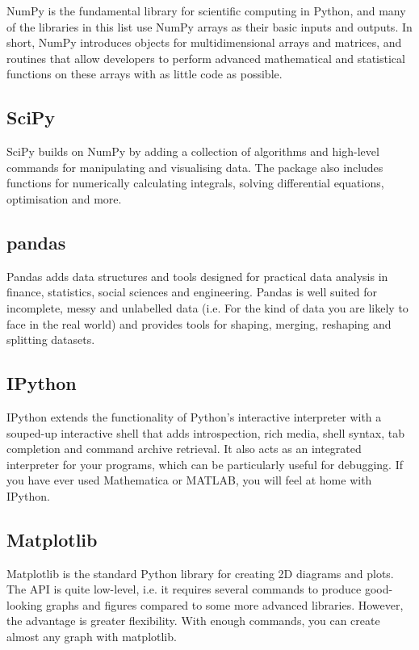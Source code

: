 NumPy is the fundamental library for scientific computing in Python, and many of the libraries in this list use NumPy arrays as their basic inputs and outputs. In short, NumPy introduces objects for multidimensional arrays and matrices, and routines that allow developers to perform advanced mathematical and statistical functions on these arrays with as little code as possible. \cite{Python:2020c}


\subsection{SciPy}

SciPy builds on NumPy by adding a collection of algorithms and high-level commands for manipulating and visualising data. The package also includes functions for numerically calculating integrals, solving differential equations, optimisation and more.

\subsection{pandas}

Pandas adds data structures and tools designed for practical data analysis in finance, statistics, social sciences and engineering. Pandas is well suited for incomplete, messy and unlabelled data (i.e. For the kind of data you are likely to face in the real world) and provides tools for shaping, merging, reshaping and splitting datasets.

\subsection{IPython}

IPython extends the functionality of Python's interactive interpreter with a souped-up interactive shell that adds introspection, rich media, shell syntax, tab completion and command archive retrieval. It also acts as an integrated interpreter for your programs, which can be particularly useful for debugging. If you have ever used Mathematica or MATLAB, you will feel at home with IPython.

\subsection{Matplotlib}

Matplotlib is the standard Python library for creating 2D diagrams and plots. The API is quite low-level, i.e. it requires several commands to produce good-looking graphs and figures compared to some more advanced libraries. However, the advantage is greater flexibility. With enough commands, you can create almost any graph with matplotlib.




